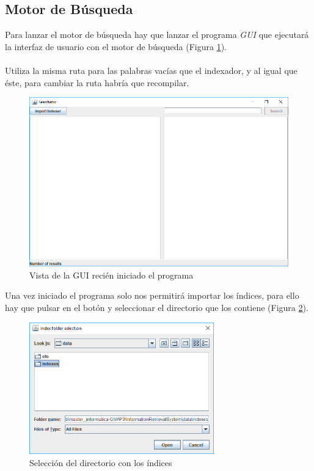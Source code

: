 \subsection{Motor de Búsqueda}

Para lanzar el motor de búsqueda hay que lanzar el programa \textit{GUI} que ejecutará la interfaz de usuario con el motor de búsqueda (Figura \ref{fig:init}).
\\ \\
Utiliza la misma ruta para las palabras vacías que el indexador, y al igual que éste, para cambiar la ruta habría que recompilar.

\begin{figure}[H]
	\centering
	\includegraphics[width=12cm]{img/init}
	\caption{Vista de la GUI recién iniciado el programa}
	\label{fig:init}
\end{figure}

Una vez iniciado el programa solo nos permitirá importar los índices, para ello hay que pulsar en el botón y seleccionar el directorio que los contiene (Figura \ref{fig:index-folder-selection}).

\begin{figure}[H]
	\centering
	\includegraphics[width=8cm]{img/index-folder-selection}
	\caption{Selección del directorio con los índices}
	\label{fig:index-folder-selection}
\end{figure}

